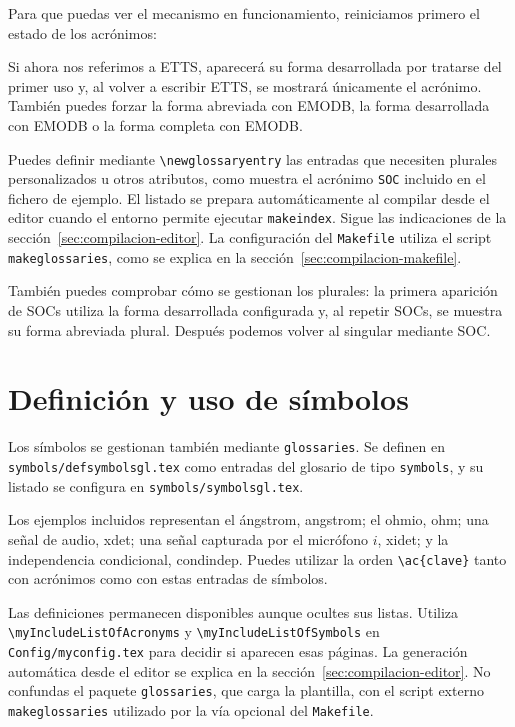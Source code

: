 Para que puedas ver el mecanismo en funcionamiento, reiniciamos primero el estado de los acrónimos:

\glsresetall[acronym]

Si ahora nos referimos a \ac{ETTS}, aparecerá su forma desarrollada por tratarse del primer uso y, al volver a escribir \ac{ETTS}, se mostrará únicamente el acrónimo. También puedes forzar la forma abreviada con \acs{EMODB}, la forma desarrollada con \acl{EMODB} o la forma completa con \acf{EMODB}.

Puedes definir mediante \texttt{\textbackslash{}newglossaryentry} las entradas que necesiten plurales personalizados u otros atributos, como muestra el acrónimo \texttt{SOC} incluido en el fichero de ejemplo. El listado se prepara automáticamente al compilar desde el editor cuando el entorno permite ejecutar \texttt{makeindex}. Sigue las indicaciones de la sección~\ref{sec:compilacion-editor}. La configuración del \texttt{Makefile} utiliza el script \texttt{makeglossaries}, como se explica en la sección~\ref{sec:compilacion-makefile}.

También puedes comprobar cómo se gestionan los plurales: la primera aparición de \acp{SOC} utiliza la forma desarrollada configurada y, al repetir \acp{SOC}, se muestra su forma abreviada plural. Después podemos volver al singular mediante \ac{SOC}.

\section{Definición y uso de símbolos}
\label{sec:simbolos}

Los símbolos se gestionan también mediante \texttt{glossaries}. Se definen en \texttt{symbols/defsymbolsgl.tex} como entradas del glosario de tipo \texttt{symbols}, y su listado se configura en \texttt{symbols/symbolsgl.tex}.

Los ejemplos incluidos representan el ángstrom, \ac{angstrom}; el ohmio, \ac{ohm}; una señal de audio, \ac{xdet}; una señal capturada por el micrófono \(i\), \ac{xidet}; y la independencia condicional, \ac{condindep}. Puedes utilizar la orden \texttt{\textbackslash{}ac\{clave\}} tanto con acrónimos como con estas entradas de símbolos.

Las definiciones permanecen disponibles aunque ocultes sus listas. Utiliza \texttt{\textbackslash{}myIncludeListOfAcronyms} y \texttt{\textbackslash{}myIncludeListOfSymbols} en \texttt{Config/myconfig.tex} para decidir si aparecen esas páginas. La generación automática desde el editor se explica en la sección~\ref{sec:compilacion-editor}. No confundas el paquete \texttt{glossaries}, que carga la plantilla, con el script externo \texttt{makeglossaries} utilizado por la vía opcional del \texttt{Makefile}.

